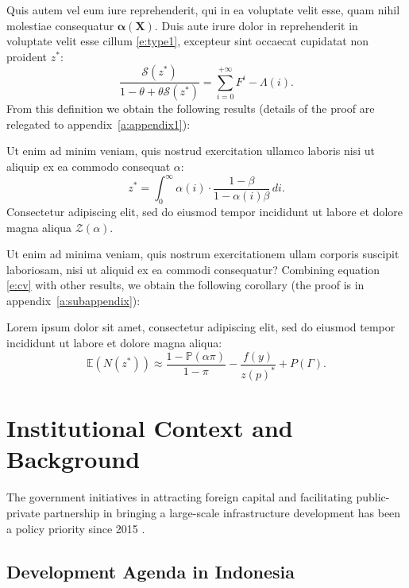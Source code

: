 \documentclass[letterpaper,12pt,leqno]{article}
\begin{document}
Quis autem vel eum iure reprehenderit, qui in ea voluptate velit esse, quam nihil molestiae consequatur $\bm{\alpha(X)}$. Duis aute irure dolor in reprehenderit in voluptate velit esse cillum \eqref{e:type1}, excepteur sint occaecat cupidatat non proident $z^*$:
\begin{equation*}
\frac{\mathcal{S}(z^*)}{1 -\theta + \theta \mathcal{S}(z^*)} = \sum_{i=0}^{+\infty}F^{i} - \Lambda(i).
\end{equation*}
From this definition we obtain the following results (details of the proof are relegated to appendix~\ref{a:appendix1}):

\begin{lemma}\label{p:cv} Ut enim ad minim veniam, quis nostrud exercitation ullamco laboris nisi ut aliquip ex ea commodo consequat $\alpha$:
\begin{equation}
z^* = \int_{0}^{\infty} \alpha(i) \cdot \frac{1-\beta}{1-\alpha(i)\beta}\,di.
\label{e:cv}\end{equation}
Consectetur adipiscing elit, sed do eiusmod tempor incididunt ut labore et dolore magna aliqua $\mathcal{Z}(\alpha)$. \end{lemma}

Ut enim ad minima veniam, quis nostrum exercitationem ullam corporis suscipit laboriosam, nisi ut aliquid ex ea commodi consequatur? Combining equation \eqref{e:cv} with other results, we obtain the following corollary (the proof is in appendix~\ref{a:subappendix}): 

\begin{corollary} Lorem ipsum dolor sit amet, consectetur adipiscing elit, sed do eiusmod tempor incididunt ut labore et dolore magna aliqua:
\begin{equation*}
\mathbb{E}(N(z^*)) \approx \frac{1-\mathbb{P}(\alpha\pi)}{1-\pi}- \frac{f(y)}{z(p)^*} +P(\Gamma).
\end{equation*}\end{corollary}

\section{Institutional Context and Background}\label{s:context}

The government initiatives in attracting foreign capital and facilitating public-private partnership in bringing a large-scale infrastructure development has been a policy priority since 2015 \citep{pwc_2016}.

\subsection{Development Agenda in Indonesia}
\end{document}
